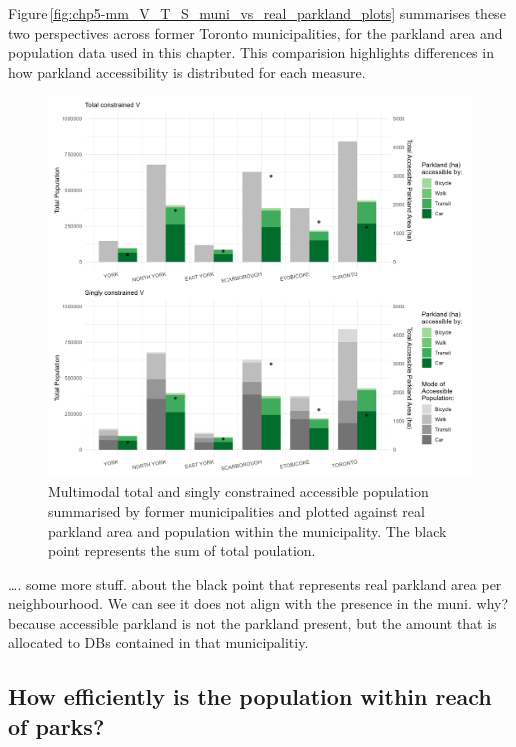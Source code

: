 \documentclass[
11pt, %
oneside, %
english, %
singlespacing, %
]{macthesis} %
\begin{document}
Figure\,\ref{fig:chp5-mm_V_T_S_muni_vs_real_parkland_plots} summarises these two perspectives across former Toronto municipalities, for the parkland area and population data used in this chapter. This comparision highlights differences in how parkland accessibility is distributed for each measure.

\begin{figure}

{\centering \includegraphics[width=6in]{./data/figures/chp5-mm_V_T_S_muni_vs_real_parkland_plots} 

}

\caption{\label{fig:chp5-mm_V_T_S_muni_vs_real_parkland_plots} Multimodal total and singly constrained accessible population summarised by former municipalities and plotted against real parkland area and population within the municipality. The black point represents the sum of total poulation.}\label{fig:unnamed-chunk-91}
\end{figure}

\ldots. some more stuff. about the black point that represents real parkland area per neighbourhood. We can see it does not align with the presence in the muni. why? because accessible parkland is not the parkland present, but the amount that is allocated to DBs contained in that municipalitiy.

\subsection{\texorpdfstring{\textbf{How efficiently is the population within reach of parks?}}{How efficiently is the population within reach of parks?}}\label{how-efficiently-is-the-population-within-reach-of-parks}
\end{document}
